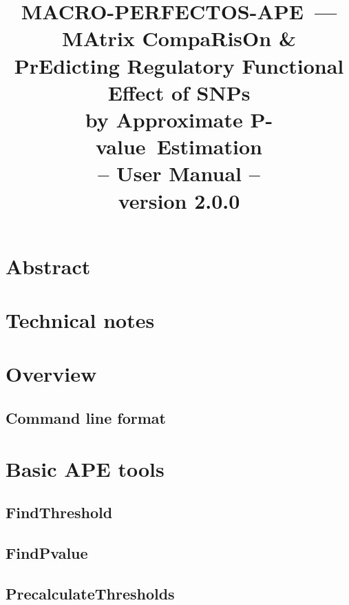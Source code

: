 \documentclass[]{article}
\newcommand*{\pvalue}{\mbox{P-value}}
\begin{document}
\title{
MACRO-PERFECTOS-APE~---\\{\small MAtrix CompaRisOn \&\\ PrEdicting Regulatory Functional Effect of SNPs\\ by Approximate \pvalue\ Estimation}\\
-- User Manual --\\
\small{version 2.0.0}
}
\maketitle

\section{Abstract}\label{abstract}


\section{Technical notes}\label{technical-notes}


\section{Overview}\label{overview}

  \subsection{Command line format}\label{command-line-format}
  

\section{Basic APE tools}\label{ape-introduction}


  \subsection{FindThreshold}\label{find-threshold}
  

  \subsection{FindPvalue}\label{find-pvalue}
  

  \subsection{PrecalculateThresholds}\label{precalculate-thresholds}
  
\end{document}
